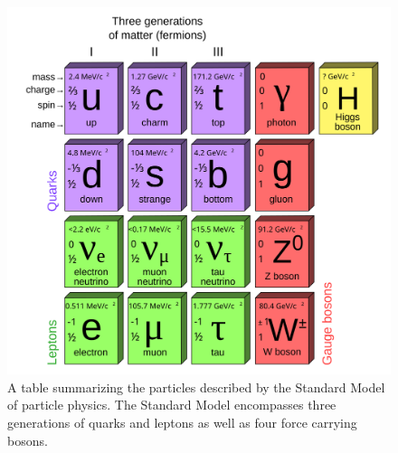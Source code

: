 \begin{figure}[htbp]
    \centering
    \includegraphics[scale=0.5, angle=0]{./figures/StandardModel}
    \caption{A table summarizing the particles described by the
    Standard Model of particle physics. The Standard Model encompasses
    three generations of quarks and leptons as well as four force carrying
    bosons.}
    \label{fig:sm}
\end{figure}

